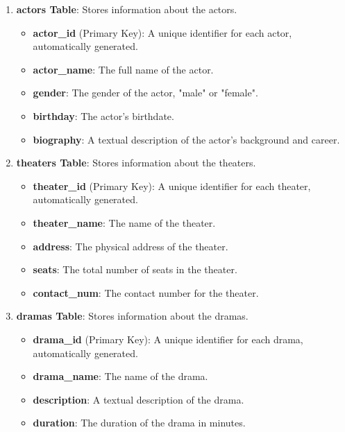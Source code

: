 \documentclass[12pt]{article}
\begin{document}
\begin{enumerate}
    \item \textbf{actors Table}: Stores information about the actors. 
    \begin{itemize}
        \item \textbf{actor\_id} (Primary Key): A unique identifier for each actor, automatically generated.
        \item \textbf{actor\_name}: The full name of the actor.
        \item \textbf{gender}: The gender of the actor, "male" or "female".
        \item \textbf{birthday}: The actor's birthdate.
        \item \textbf{biography}: A textual description of the actor's background and career.
    \end{itemize}

    \item \textbf{theaters Table}: Stores information about the theaters. 
    \begin{itemize}
        \item \textbf{theater\_id} (Primary Key): A unique identifier for each theater, automatically generated.
        \item \textbf{theater\_name}: The name of the theater.
        \item \textbf{address}: The physical address of the theater.
        \item \textbf{seats}: The total number of seats in the theater. 
        \item \textbf{contact\_num}: The contact number for the theater.
    \end{itemize}

    \item \textbf{dramas Table}: Stores information about the dramas. 
    \begin{itemize}
        \item \textbf{drama\_id} (Primary Key): A unique identifier for each drama, automatically generated.
        \item \textbf{drama\_name}: The name of the drama.
        \item \textbf{description}: A textual description of the drama.
        \item \textbf{duration}: The duration of the drama in minutes.
    \end{itemize}


\end{enumerate}
\end{document}
